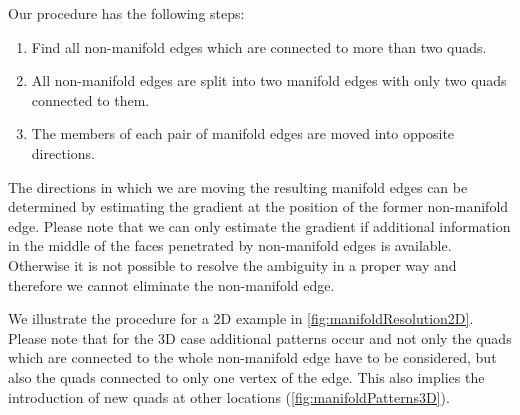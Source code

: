 Our procedure has the following steps:
\begin{enumerate}
\item Find all non-manifold edges which are connected to more than two \acp{quad}.
\item All non-manifold edges are split into two manifold edges with only two \acp{quad} connected to them.
\item The members of each pair of manifold edges are moved into opposite directions. 
\end{enumerate}
The directions in which we are moving the resulting manifold edges can be determined by estimating the gradient at the position of the former non-manifold edge. Please note that we can only estimate the gradient if additional information in the middle of the faces penetrated by non-manifold edges is available. Otherwise it is not possible to resolve the ambiguity in a proper way and therefore we cannot eliminate the non-manifold edge. 

We illustrate the procedure for a 2D example in \autoref{fig:manifoldResolution2D}. Please note that for the 3D case additional patterns occur and not only the \acp{quad} which are connected to the whole non-manifold edge have to be considered, but also the \acp{quad} connected to only one vertex of the edge. This also implies the introduction of new \acp{quad} at other locations (\autoref{fig:manifoldPatterns3D}).

